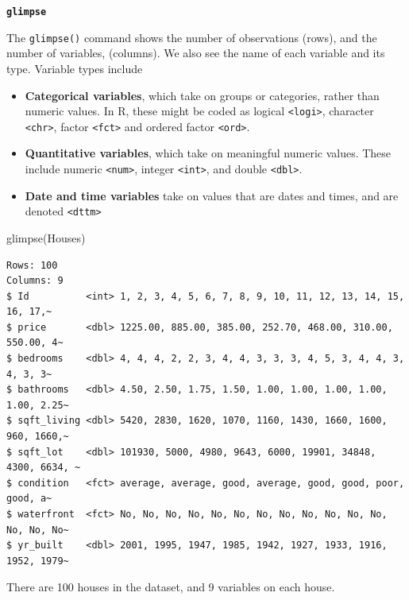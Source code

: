 \documentclass[
  letterpaper,
  DIV=11,
  numbers=noendperiod]{scrreprt}
\newenvironment{Shaded}{\begin{snugshade}}{\end{snugshade}}
\newcommand{\FunctionTok}[1]{\textcolor[rgb]{0.28,0.35,0.67}{#1}}
\newcommand{\NormalTok}[1]{\textcolor[rgb]{0.00,0.23,0.31}{#1}}
\begin{document}
\textbf{\texttt{glimpse}}

The \texttt{glimpse()} command shows the number of observations (rows),
and the number of variables, (columns). We also see the name of each
variable and its type. Variable types include

\begin{itemize}
\item
  \textbf{Categorical variables}, which take on groups or categories,
  rather than numeric values. In R, these might be coded as logical
  \texttt{\textless{}logi\textgreater{}}, character
  \texttt{\textless{}chr\textgreater{}}, factor
  \texttt{\textless{}fct\textgreater{}} and ordered factor
  \texttt{\textless{}ord\textgreater{}}.
\item
  \textbf{Quantitative variables}, which take on meaningful numeric
  values. These include numeric \texttt{\textless{}num\textgreater{}},
  integer \texttt{\textless{}int\textgreater{}}, and double
  \texttt{\textless{}dbl\textgreater{}}.
\item
  \textbf{Date and time variables} take on values that are dates and
  times, and are denoted \texttt{\textless{}dttm\textgreater{}}
\end{itemize}

\begin{Shaded}
\begin{Highlighting}[]
\FunctionTok{glimpse}\NormalTok{(Houses)}
\end{Highlighting}
\end{Shaded}

\begin{verbatim}
Rows: 100
Columns: 9
$ Id          <int> 1, 2, 3, 4, 5, 6, 7, 8, 9, 10, 11, 12, 13, 14, 15, 16, 17,~
$ price       <dbl> 1225.00, 885.00, 385.00, 252.70, 468.00, 310.00, 550.00, 4~
$ bedrooms    <dbl> 4, 4, 4, 2, 2, 3, 4, 4, 3, 3, 3, 4, 5, 3, 4, 4, 3, 4, 3, 3~
$ bathrooms   <dbl> 4.50, 2.50, 1.75, 1.50, 1.00, 1.00, 1.00, 1.00, 1.00, 2.25~
$ sqft_living <dbl> 5420, 2830, 1620, 1070, 1160, 1430, 1660, 1600, 960, 1660,~
$ sqft_lot    <dbl> 101930, 5000, 4980, 9643, 6000, 19901, 34848, 4300, 6634, ~
$ condition   <fct> average, average, good, average, good, good, poor, good, a~
$ waterfront  <fct> No, No, No, No, No, No, No, No, No, No, No, No, No, No, No~
$ yr_built    <dbl> 2001, 1995, 1947, 1985, 1942, 1927, 1933, 1916, 1952, 1979~
\end{verbatim}

There are 100 houses in the dataset, and 9 variables on each house.
\end{document}
